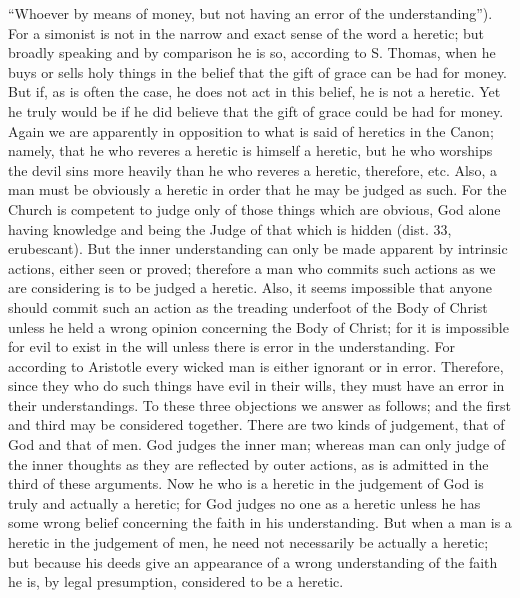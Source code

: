        “Whoever by means of money, but not having an error of the understanding”). For a
       simonist is not in the narrow and exact sense of the word a heretic; but broadly speaking and
       by comparison he is so, according to S. Thomas, when he buys or sells holy things in the
       belief that the gift of grace can be had for money. But if, as is often the case, he does not act
       in this belief, he is not a heretic. Yet he truly would be if he did believe that the gift of grace
       could be had for money.
             Again we are apparently in opposition to what is said of heretics in the Canon; namely,
       that he who reveres a heretic is himself a heretic, but he who worships the devil sins more
       heavily than he who reveres a heretic, therefore, etc.
             Also, a man must be obviously a heretic in order that he may be judged as such. For the
       Church is competent to judge only of those things which are obvious, God alone having
       knowledge and being the Judge of that which is hidden (dist. 33, erubescant). But the inner
       understanding can only be made apparent by intrinsic actions, either seen or proved;
       therefore a man who commits such actions as we are considering is to be judged a heretic.
             Also, it seems impossible that anyone should commit such an action as the treading
       underfoot of the Body of Christ unless he held a wrong opinion concerning the Body of
       Christ; for it is impossible for evil to exist in the will unless there is error in the
       understanding. For according to Aristotle every wicked man is either ignorant or in error.
       Therefore, since they who do such things have evil in their wills, they must have an error in
       their understandings.
             To these three objections we answer as follows; and the first and third may be
       considered together. There are two kinds of judgement, that of God and that of men. God
       judges the inner man; whereas man can only judge of the inner thoughts as they are reflected
       by outer actions, as is admitted in the third of these arguments. Now he who is a heretic in
       the judgement of God is truly and actually a heretic; for God judges no one as a heretic
       unless he has some wrong belief concerning the faith in his understanding. But when a man
       is a heretic in the judgement of men, he need not necessarily be actually a heretic; but
       because his deeds give an appearance of a wrong understanding of the faith he is, by legal
       presumption, considered to be a heretic.

